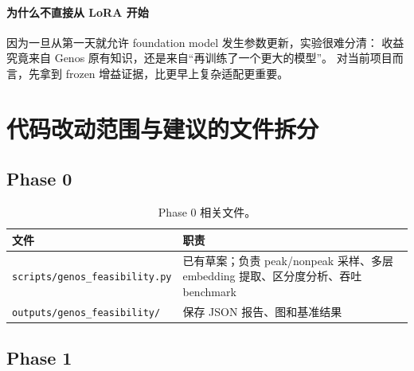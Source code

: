 \documentclass[11pt,a4paper]{ctexart}
\begin{document}
\paragraph{为什么不直接从 LoRA 开始}
因为一旦从第一天就允许 foundation model 发生参数更新，实验很难分清：
收益究竟来自 Genos 原有知识，还是来自“再训练了一个更大的模型”。
对当前项目而言，先拿到 frozen 增益证据，比更早上复杂适配更重要。

\section{代码改动范围与建议的文件拆分}

\subsection{Phase 0}

\begin{table}[H]
\centering
\small
\caption{Phase 0 相关文件。}
\label{tab:phase0_files}
\begin{tabularx}{\textwidth}{l Y}
\toprule
文件 & 职责 \\
\midrule
\texttt{scripts/genos\_feasibility.py} & 已有草案；负责 peak/nonpeak 采样、多层 embedding 提取、区分度分析、吞吐 benchmark \\
\texttt{outputs/genos\_feasibility/} & 保存 JSON 报告、图和基准结果 \\
\bottomrule
\end{tabularx}
\end{table}

\subsection{Phase 1}
\end{document}
